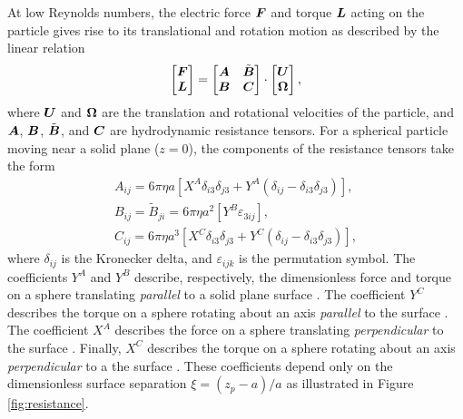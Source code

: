 \begin{appendices}
At low Reynolds numbers, the electric force $\boldsymbol{F}$ and torque $\boldsymbol{L}$ acting on the particle gives rise to its translational and rotation motion as described by the linear relation
\begin{equation}
    \begin{bmatrix}
    \boldsymbol{F} \\ \boldsymbol{L}
    \end{bmatrix}
    =
    \begin{bmatrix}
    \boldsymbol{A} & \tilde{\boldsymbol{B}}
    \\ 
    \boldsymbol{B} & \boldsymbol{C}
    \end{bmatrix}
    \cdot
    \begin{bmatrix}
    \boldsymbol{U} \\ \boldsymbol{\Omega}
    \end{bmatrix}, \label{eq:resistance}
\end{equation}
where $\boldsymbol{U}$ and $\boldsymbol{\Omega}$ are the translation and rotational velocities of the particle, and  $\boldsymbol{A}$, $\boldsymbol{B}$, $\tilde{\boldsymbol{B}}$, and $\boldsymbol{C}$ are hydrodynamic resistance tensors.  For a spherical particle moving near a solid plane ($z=0$), the components of the resistance tensors take the form 
\begin{gather}
    A_{ij} = 6\pi\eta a \left[ X^A \delta_{i3}\delta_{j3} + Y^A (\delta_{ij} - \delta_{i3}\delta_{j3}) \right], 
    \\
    B_{ij} = \tilde{B}_{ji} = 6\pi\eta a^2 \left[ Y^B \varepsilon_{3ij} \right],
    \\
    C_{ij} = 6\pi\eta a^3 \left[  X^C \delta_{i3}\delta_{j3} + Y^C (\delta_{ij} - \delta_{i3}\delta_{j3}) \right], 
\end{gather}
where $\delta_{ij}$ is the Kronecker delta, and $\varepsilon_{ijk}$ is the permutation symbol. The coefficients $Y^A$ and $Y^B$ describe, respectively, the dimensionless force and torque on a sphere translating \emph{parallel} to a solid plane surface \autocite{ONeill1964a}. The coefficient $Y^C$ describes the torque on a sphere rotating about an axis \emph{parallel} to the surface \autocite{Dean1963}. The coefficient $X^A$ describes the force on a sphere translating \emph{perpendicular} to the surface \autocite{Brenner1961a}.  Finally, $X^C$ describes the torque on a sphere rotating about an axis \emph{perpendicular} to a the surface \autocite{Jeffrey1915}. These coefficients depend only on the dimensionless surface separation $\xi = (z_p - a)/a$ as illustrated in Figure \ref{fig:resistance}. 


\end{appendices}
